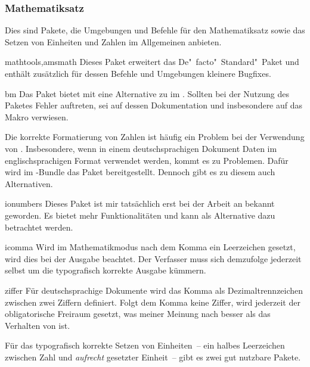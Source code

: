 \subsubsection{Mathematiksatz}
Dies sind Pakete, die Umgebungen und Befehle für den Mathematiksatz sowie das 
Setzen von Einheiten und Zahlen im Allgemeinen anbieten.

\begin{packages}
  \item[mathtools,amsmath]
    Dieses Paket erweitert das De"~facto"~Standard"~Paket  und 
    enthält zusätzlich für dessen Befehle und Umgebungen kleinere Bugfixes.
  \item[bm]
    Das Paket bietet mit  eine Alternative zu  im 
    . Sollten bei
    der Nutzung des Paketes Fehler auftreten, sei auf dessen Dokumentation und 
    insbesondere auf das Makro  verwiesen.
\end{packages}
%
Die korrekte Formatierung von Zahlen ist häufig ein Problem bei der Verwendung 
von . Insbesondere, wenn in einem deutschsprachigen Dokument 
Daten im englischsprachigen Format verwendet werden, kommt es zu Problemen. 
Dafür wird im \TUDScript-Bundle das Paket  bereitgestellt. 
Dennoch gibt es zu diesem auch Alternativen.
%
\begin{packages}
%
  \item[ionumbers]
    Dieses Paket ist mir tatsächlich erst bei der Arbeit an  
    bekannt geworden. Es bietet mehr Funktionalitäten und kann als Alternative 
    dazu betrachtet werden.
  \item[icomma]
    Wird im Mathematikmodus nach dem Komma ein Leerzeichen gesetzt, wird dies 
    bei der Ausgabe beachtet. Der Verfasser muss sich demzufolge jederzeit 
    selbst um die typografisch korrekte Ausgabe kümmern.
  \item[ziffer]
    Für deutschsprachige Dokumente wird das Komma als Dezimaltrennzeichen 
    zwischen zwei Ziffern definiert. Folgt dem Komma keine Ziffer, wird 
    jederzeit der obligatorische Freiraum gesetzt, was meiner Meinung nach 
    besser als das Verhalten von  ist.
%
\end{packages}
%
Für das typografisch korrekte Setzen von Einheiten~-- ein halbes Leerzeichen 
zwischen Zahl und \emph{aufrecht} gesetzter Einheit~-- gibt es zwei gut 
nutzbare Pakete.
